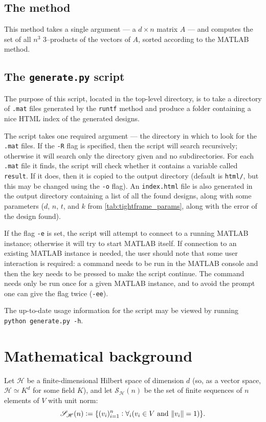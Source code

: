 \documentclass{article}
\newcommand{\scrS}{\mathscr{S}}
\newcommand{\scrH}{\mathscr{H}}
\theoremstyle{definition}
\begin{document}
  \subsection{The  method}
  This method takes a single argument --- a $ d \times n $ matrix $ A $ --- and computes the set of all $ n^3 $ 3--products of the vectors of $ A $,
  sorted according to the MATLAB  method.

  \subsection{The \texttt{generate.py} script}
  The purpose of this script, located in the top-level directory, is to take a directory of \texttt{.mat} files generated
  by the \texttt{runtf} method and produce a folder containing a nice HTML index of the generated designs.

  The script takes one required argument --- the directory in which to look for the \texttt{.mat} files. If the \texttt{-R}
  flag is specified, then the script will search recursively; otherwise it will search only the directory given and no subdirectories.
  For each \texttt{.mat} file it finds, the script will check whether it contains a variable called \texttt{result}. If it does,
  then it is copied to the output directory (default is \texttt{html/}, but this may be changed using the \texttt{-o} flag). An
  \texttt{index.html} file is also generated in the output directory containing a list of all the found designs, along with some
  parameters ($d$, $n$, $t$, and $k $ from \cref{tab:tightframe_params}, along with the error of the design found).

  If the flag \texttt{-e} is set, the script will attempt to connect to a running MATLAB instance; otherwise it will try to start
  MATLAB itself. If connection to an existing MATLAB instance is needed, the user should note that some user interaction is required:
  a command needs to be run in the MATLAB console and then the \Enter key needs to be pressed to make the script continue. The command
  needs only be run once for a given MATLAB instance, and to avoid the prompt one can give the flag twice (\texttt{-ee}).

  The up-to-date usage information for the script may be viewed by running \texttt{python generate.py -h}.

  \section{Mathematical background}
  Let $ \scrH $ be a finite-dimensional Hilbert space of dimension $ d $ (so, as a vector space,
  $ \scrH \simeq K^d $ for some field $ K $), and let $ \scrS_\scrH(n) $ be the set of finite
  sequences of $ n $ elements of $ V $ with unit norm:
  \begin{displaymath}
    \scrS_\scrH(n) := \{ (v_i)_{i = 1}^n : \forall_i (v_i \in V \text{ and } \norm{v_i} = 1) \}.
  \end{displaymath}
\end{document}
